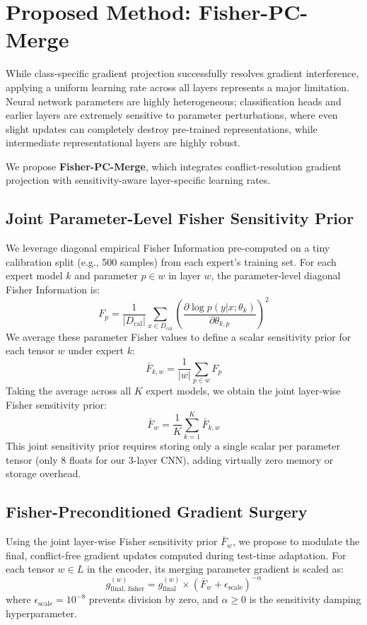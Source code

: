 \documentclass{article}
\theoremstyle{plain}
\theoremstyle{definition}
\theoremstyle{remark}
\begin{document}
\section{Proposed Method: Fisher-PC-Merge}
\label{proposed_method}
While class-specific gradient projection successfully resolves gradient interference, applying a uniform learning rate across all layers represents a major limitation. Neural network parameters are highly heterogeneous; classification heads and earlier layers are extremely sensitive to parameter perturbations, where even slight updates can completely destroy pre-trained representations, while intermediate representational layers are highly robust.

We propose \textbf{Fisher-PC-Merge}, which integrates conflict-resolution gradient projection with sensitivity-aware layer-specific learning rates.

\subsection{Joint Parameter-Level Fisher Sensitivity Prior}
We leverage diagonal empirical Fisher Information pre-computed on a tiny calibration split (e.g., 500 samples) from each expert's training set. For each expert model $k$ and parameter $p \in w$ in layer $w$, the parameter-level diagonal Fisher Information is:
\begin{equation}
    F_p = \frac{1}{|D_{\text{cal}}|} \sum_{x \in D_{\text{cal}}} \left( \frac{\partial \log p(y | x; \theta_k)}{\partial \theta_{k, p}} \right)^2
\end{equation}
We average these parameter Fisher values to define a scalar sensitivity prior for each tensor $w$ under expert $k$:
\begin{equation}
    \bar{F}_{k, w} = \frac{1}{|w|} \sum_{p \in w} F_p
\end{equation}
Taking the average across all $K$ expert models, we obtain the joint layer-wise Fisher sensitivity prior:
\begin{equation}
    \bar{F}_w = \frac{1}{K} \sum_{k=1}^K \bar{F}_{k, w}
\end{equation}
This joint sensitivity prior requires storing only a single scalar per parameter tensor (only 8 floats for our 3-layer CNN), adding virtually zero memory or storage overhead.

\subsection{Fisher-Preconditioned Gradient Surgery}
Using the joint layer-wise Fisher sensitivity prior $\bar{F}_w$, we propose to modulate the final, conflict-free gradient updates computed during test-time adaptation. For each tensor $w \in L$ in the encoder, its merging parameter gradient is scaled as:
\begin{equation}
    g_{\text{final, fisher}}^{(w)} = g_{\text{final}}^{(w)} \times (\bar{F}_w + \epsilon_{\text{scale}})^{-\alpha}
\end{equation}
where $\epsilon_{\text{scale}} = 10^{-8}$ prevents division by zero, and $\alpha \geq 0$ is the sensitivity damping hyperparameter. 
\end{document}
